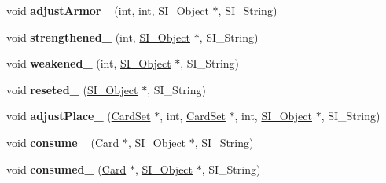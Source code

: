 \begin{DoxyCompactItemize}
\mbox{\label{class_card_a3bf57c66d92a7c40d450b2072eb5c643}} 
void {\bfseries adjust\+Armor\+\_\+} (int, int, \hyperlink{class_s_i___object}{S\+I\+\_\+\+Object} $\ast$, S\+I\+\_\+\+String)
\item 
\mbox{\label{class_card_a8842b16cfab0bd061cbd7962b54bf69d}} 
void {\bfseries strengthened\+\_\+} (int, \hyperlink{class_s_i___object}{S\+I\+\_\+\+Object} $\ast$, S\+I\+\_\+\+String)
\item 
\mbox{\label{class_card_a6df9b23b65116dbc8e4b76526030fe2c}} 
void {\bfseries weakened\+\_\+} (int, \hyperlink{class_s_i___object}{S\+I\+\_\+\+Object} $\ast$, S\+I\+\_\+\+String)
\item 
\mbox{\label{class_card_a2a94d6d15649199fae7a972f436fc3f3}} 
void {\bfseries reseted\+\_\+} (\hyperlink{class_s_i___object}{S\+I\+\_\+\+Object} $\ast$, S\+I\+\_\+\+String)
\item 
\mbox{\label{class_card_a5d230a2e76a0b74ddc3f848b5f0fdc82}} 
void {\bfseries adjust\+Place\+\_\+} (\hyperlink{class_card_set}{Card\+Set} $\ast$, int, \hyperlink{class_card_set}{Card\+Set} $\ast$, int, \hyperlink{class_s_i___object}{S\+I\+\_\+\+Object} $\ast$, S\+I\+\_\+\+String)
\item 
\mbox{\label{class_card_ade61baff01ef01fd93a6cdcd18e1c1bb}} 
void {\bfseries consume\+\_\+} (\hyperlink{class_card}{Card} $\ast$, \hyperlink{class_s_i___object}{S\+I\+\_\+\+Object} $\ast$, S\+I\+\_\+\+String)
\item 
\mbox{\label{class_card_ab521eee2c82fdef858eb6cf33b396e31}} 
void {\bfseries consumed\+\_\+} (\hyperlink{class_card}{Card} $\ast$, \hyperlink{class_s_i___object}{S\+I\+\_\+\+Object} $\ast$, S\+I\+\_\+\+String)
\end{DoxyCompactItemize}
